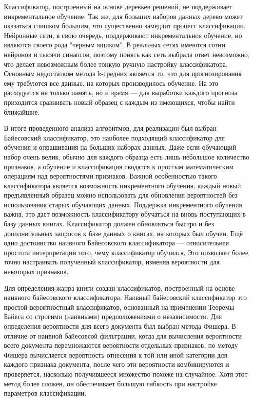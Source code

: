 \documentclass[a4paper]{report}
\begin{document}
Классификатор, построенный на основе деревьев решений, не поддерживает инкрементальное обучение. Так же, для больших наборов данных дерево может оказаться слишком большим, что существенно замедлит процесс классификации. Нейронные сети, в свою очередь, поддерживают инкрементальное обучение, но являются своего рода "черным ящиком". В реальных сетях имеются сотни нейронов и тысячи синапсов, поэтому понять как сеть выбрала ответ невозможно, что делает невозможным более тонкую ручную настройку классификатора. Основным недостатком метода k-средних является то, что для прогнозирования ему требуются все данные, на которых производилось обучение. На это расходуется не только память, но и время --- для выработки каждого прогноза приходится сравнивать новый образец с каждым из имеющихся, чтобы найти ближайшие. 

В итоге проведенного анализа алгоритмов, для реализации был выбран Байесовский классификатор, \tk это наиболее подходящий классификатор для обучения и опрашивания на больших наборах данных. Даже если обучающий набор очень велик, обычно для каждого образца есть лишь небольшое количество признаков, а обучение и классификация сводятся к простым математическим операциям над вероятностями признаков. Важной особенностью такого классификатора является возможность инкрементного обучения, \te каждый новый предъявленный образец можно использовать для обновления вероятностей без использования старых обучающих данных. Поддержка инкрементного обучения важна, \tk это дает возможность классификатору обучаться на вновь поступающих в базу данных книгах. Классификатор должен обновляться быстро и без дополнительных запросов к базе данных о книгах, на которых был обучен. Ещё одно достоинство наивного Байесовского классификатора --- относительная простота интерпретации того, чему классификатор обучился. Это позволяет более точно настраивать полученный классификатор, изменяя вероятности для некоторых признаков.


 Для определения жанра книги создан классификатор, построенный на основе наивного байесовского классификатора. Наивный байесовский классификатор это простой вероятностный классификатор, основанный на применении Теоремы Байеса со строгими (наивными) предположениями о независимости. Для определения вероятности для всего документа был выбран метода Фишера. 
В отличие от наивной байесовсой фильтрации, когда для вычисления вероятности всего документа перемножаются вероятности отдельных признаков, по методу Фишера вычисляется вероятность отнесения к той или иной категории для каждого признака документа, после чего эти вероятности комбинируются и проверяется, насколько получившееся множество похоже на случайное. Хотя этот метод более сложен, он обеспечивает большую гибкость при настройке параметров классификации.
\end{document}
